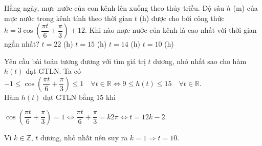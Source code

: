 \begin{ex}%
Hằng ngày, mực nước của con kênh lên xuống theo thủy triều. Độ sâu $h$ (m) của mực nước trong kênh tính theo thời gian $t$ (h) được cho bởi công thức $h=3\cos\left(\dfrac{\pi t}{6}+\dfrac{\pi}{3}\right)+12$. Khi nào mực nước của kênh là cao nhất với thời gian ngắn nhất?
\choice
{$t=22$ (h)}
{$t=15$ (h)}
{$t=14$ (h)}
{\True $t=10$ (h)}
\loigiai
{Yêu cầu bài toán tương đương với tìm giá trị $t$ dương, nhỏ nhất sao cho hàm $h(t)$ đạt GTLN. Ta có
$-1\leq\cos\left(\dfrac{\pi t}{6}+\dfrac{\pi}{3}\right)\leq 1\quad \forall t\in\mathbb{R}\Leftrightarrow 9\leq h(t)\leq 15\quad \forall t\in\mathbb{R}.$\\
Hàm $h(t)$ đạt GTLN bằng $15$ khi
\begin{center}
$\cos\left(\dfrac{\pi t}{6}+\dfrac{\pi}{3}\right)=1\Leftrightarrow \dfrac{\pi t}{6}+\dfrac{\pi}{3}=k2\pi\Leftrightarrow t=12k-2$.
\end{center}
Vì $k\in\mathbb{Z}$, $t$ dương, nhỏ nhất nên suy ra $k=1\Rightarrow t=10$.
}
\end{ex}


